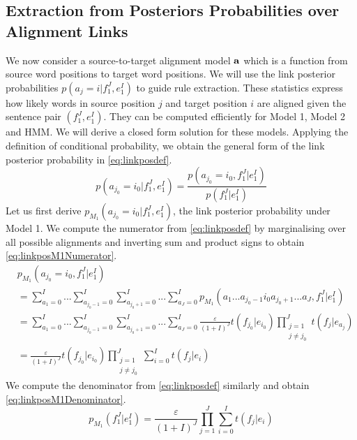 \subsection[Extraction from Posteriors Probabilities over Alignment Links]{Extraction from Posteriors Probabilities over \\ Alignment Links}
\label{sec:extractionFromPosteriorsLink}

We now consider a source-to-target alignment model ${\bf a}$ which is a function
from source word positions to target word positions. We will use the link
posterior probabilities $p(a_j = i | f_1^J, e_1^I)$ to guide
rule extraction. These statistics express how likely words in source position
$j$ and target position $i$ are aligned given the sentence pair $(f_1^J,e_1^I)$.
They can be computed efficiently for Model 1, Model 2 and HMM. We will derive
a closed form solution for these models. Applying the definition of conditional
probability, we obtain the general form of the link posterior probability in
\autoref{eq:linkposdef}.
%
\begin{equation} \label{eq:linkposdef}
  p(a_{j_0} = i_0 | f_1^J, e_1^I) = \frac{p(a_{j_0}=i_0,f_1^J|e_1^I)}{p(f_1^J|e_1^I)}
\end{equation}
%
Let us first derive $p_{M_1}(a_{j_0} = i_0 | f_1^J, e_1^I)$, the link posterior
probability under Model 1. We compute the numerator from
\autoref{eq:linkposdef} by marginalising over all possible alignments and
inverting sum and product signs to obtain \autoref{eq:linkposM1Numerator}.
%
\begin{align}
  & p_{M_1}(a_{j_0}=i_0,f_1^J|e_1^I) \nonumber \\
  &= \sum_{a_1 = 0}^{I} ... \sum_{a_{j_0-1} = 0}^{I} \sum_{a_{j_0+1} = 0}^{I} ... \sum_{a_J = 0}^{I} p_{M_1}(a_1 ... a_{j_0-1} i_0 a_{j_0+1} ... a_J,f_1^J|e_1^I) \nonumber \\
  &= \sum_{a_1 = 0}^{I} ... \sum_{a_{j_0-1} = 0}^{I} \sum_{a_{j_0+1} = 0}^{I} ... \sum_{a_J = 0}^{I} \frac{\varepsilon}{(1+I)^J} t(f_{j_0}|e_{i_0}) \prod_{\substack{j = 1 \\ j \neq j_0}}^J t(f_j|e_{a_j}) \nonumber \\
  &= \frac{\varepsilon}{(1+I)^J} t(f_{j_0}|e_{i_0}) \prod_{\substack{j = 1 \\ j \neq j_0}}^J \sum_{i=0}^I t(f_j|e_i) \label{eq:linkposM1Numerator}
\end{align}
%
We compute the denominator from \autoref{eq:linkposdef} similarly and obtain
\autoref{eq:linkposM1Denominator}.
%
\begin{equation} \label{eq:linkposM1Denominator}
  p_{M_1}(f_1^J|e_1^I) = \frac{\varepsilon}{(1+I)^J} \prod_{j=1}^J \sum_{i=0}^I t(f_j|e_i)
\end{equation}
